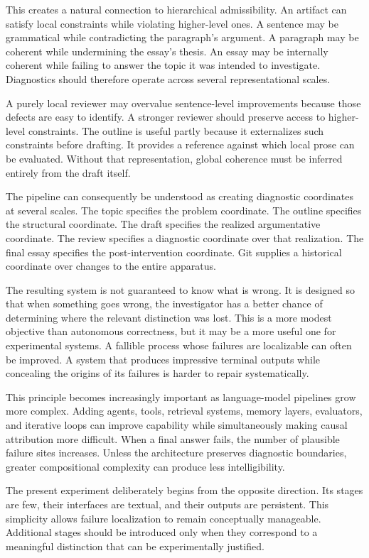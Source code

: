 \documentclass[11pt]{article}
\begin{document}
This creates a natural connection to hierarchical admissibility. An artifact can satisfy local constraints while violating higher-level ones. A sentence may be grammatical while contradicting the paragraph's argument. A paragraph may be coherent while undermining the essay's thesis. An essay may be internally coherent while failing to answer the topic it was intended to investigate. Diagnostics should therefore operate across several representational scales.

A purely local reviewer may overvalue sentence-level improvements because those defects are easy to identify. A stronger reviewer should preserve access to higher-level constraints. The outline is useful partly because it externalizes such constraints before drafting. It provides a reference against which local prose can be evaluated. Without that representation, global coherence must be inferred entirely from the draft itself.

The pipeline can consequently be understood as creating diagnostic coordinates at several scales. The topic specifies the problem coordinate. The outline specifies the structural coordinate. The draft specifies the realized argumentative coordinate. The review specifies a diagnostic coordinate over that realization. The final essay specifies the post-intervention coordinate. Git supplies a historical coordinate over changes to the entire apparatus.

The resulting system is not guaranteed to know what is wrong. It is designed so that when something goes wrong, the investigator has a better chance of determining where the relevant distinction was lost. This is a more modest objective than autonomous correctness, but it may be a more useful one for experimental systems. A fallible process whose failures are localizable can often be improved. A system that produces impressive terminal outputs while concealing the origins of its failures is harder to repair systematically.

This principle becomes increasingly important as language-model pipelines grow more complex. Adding agents, tools, retrieval systems, memory layers, evaluators, and iterative loops can improve capability while simultaneously making causal attribution more difficult. When a final answer fails, the number of plausible failure sites increases. Unless the architecture preserves diagnostic boundaries, greater compositional complexity can produce less intelligibility.

The present experiment deliberately begins from the opposite direction. Its stages are few, their interfaces are textual, and their outputs are persistent. This simplicity allows failure localization to remain conceptually manageable. Additional stages should be introduced only when they correspond to a meaningful distinction that can be experimentally justified.
\end{document}
